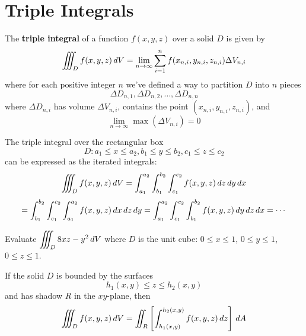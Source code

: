 \documentclass[letterpaper, twoside, 12pt]{book}
\begin{document}
\setcounter{section}{6}
\section{Triple Integrals} %

\begin{definition}
  The \textbf{triple integral} of a function $f(x,y,z)$ over a solid $D$ is
  given by
    \[
      \iiint_D f(x,y,z)\,d{V} =
      \lim_{n\to\infty}\sum_{i=1}^n f(x_{n,i},y_{n,i},z_{n,i})\Delta V_{n,i}
    \]
  where for each positive integer $n$ we've defined a way to partition
  $D$ into $n$ pieces
    \[
      \Delta D_{n,1},\Delta D_{n,2},\dots,\Delta D_{n,n}
    \]
  where $\Delta D_{n,i}$ has volume $\Delta V_{n,i}$,
  contains the point $(x_{n,i},y_{n,i},z_{n,i})$,
  and \[\lim_{n\to\infty} \max(\Delta V_{n,i}) = 0\]
\end{definition}

\begin{theorem}
  The triple integral over the rectangular box
    \[
      D: a_1\leq x\leq a_2, b_1\leq y\leq b_2, c_1\leq z\leq c_2
    \]
  can be expressed as the iterated integrals:
    \[
      \iiint_D f(x,y,z)\,d{V}
        =
      \int_{a_1}^{a_2}\int_{b_1}^{b_2}\int_{c_1}^{c_2}
      f(x,y,z)\,d{z}\,d{y}\,d{x}
    \]
    \[
      = \int_{b_1}^{b_2}\int_{c_1}^{c_2}\int_{a_1}^{a_2}
      f(x,y,z)\,d{x}\,d{z}\,d{y}
      = \int_{a_1}^{a_2}\int_{c_1}^{c_2}\int_{b_1}^{b_2}
      f(x,y,z)\,d{y}\,d{z}\,d{x}
      = \cdots
    \]
\end{theorem}

          \begin{problem}
            Evaluate $\displaystyle\iiint_D 8xz-y^2\,d{V}$ where
            $D$ is the unit cube: $0\leq x\leq 1$,
            $0\leq y\leq 1$, $0\leq z\leq 1$.
          \end{problem}

          \begin{solution}

          \end{solution}

          \begin{contributors}

          \end{contributors}

\begin{theorem}
  If the solid $D$ is bounded by the surfaces
    \[
      h_1(x,y)\leq z\leq h_2(x,y)
    \]
  and has shadow $R$ in the $xy$-plane, then
    \[
      \iiint_D f(x,y,z)\,d{V}
        =
      \iint_R\left[ \int_{h_1(x,y)}^{h_2(x,y)} f(x,y,z) \,d{z} \right]\,d{A}
    \]
\end{theorem}
\end{document}
